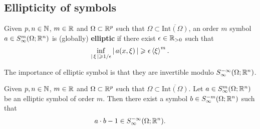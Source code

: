 \documentclass[12pt]{article}
\begin{document}
\subsection{Ellipticity of symbols}
\begin{fdefinition}
    Given $p, n \in \N$, $m \in \R$ and $\Omega \subset \R^p$ such that $\Omega \subset \overline{\mathrm{Int}(\Omega)}$, an order $m$ symbol $a \in S^m_\infty(\Omega; \R^n)$ is (globally) \textbf{elliptic} if there exist $\epsilon \in \R_{>0}$ such that 
    \[
        \inf_{\abs{\xi} \geq 1/\epsilon} \abs{a(x, \xi)} \geq \epsilon \sym[\xi]^m. 
    \]
\end{fdefinition}
The importance of elliptic symbol is that they are invertible modulo $S^{-\infty}_\infty(\Omega; \R^n)$. 

\begin{flemma}
    Given $p, n \in \N$, $m \in \R$ and $\Omega \subset \R^p$ such that $\Omega \subset \overline{\mathrm{Int}(\Omega)}$. Let $a \in S^m_\infty(\Omega; \R^n)$ be an elliptic symbol of order $m$. Then there exist a symbol $b \in S^{-m}_\infty(\Omega; \R^n)$ such that 
    \[
    a \cdot b - 1 \in S^{-\infty}_\infty(\Omega; \R^n). 
    \]
\end{flemma}
\end{document}
